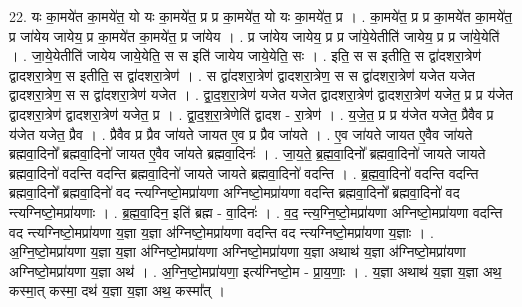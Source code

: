 \documentclass[17pt]{extarticle}
\begin{document}
22. यः का॒मये॑त का॒मये॑त॒ यो यः का॒मये॑त॒ प्र प्र का॒मये॑त॒ यो यः का॒मये॑त॒ प्र । . का॒मये॑त॒ प्र प्र का॒मये॑त का॒मये॑त॒ प्र जा॑येय जायेय॒ प्र का॒मये॑त का॒मये॑त॒ प्र जा॑येय । . प्र जा॑येय जायेय॒ प्र प्र जा॑ये॒येतीति॑ जायेय॒ प्र प्र जा॑ये॒येति॑ । . जा॒ये॒येतीति॑ जायेय जाये॒येति॒ स स इति॑ जायेय जाये॒येति॒ सः । . इति॒ स स इतीति॒ स द्वा॑दशरा॒त्रेण॑ द्वादशरा॒त्रेण॒ स इतीति॒ स द्वा॑दशरा॒त्रेण॑ । . स द्वा॑दशरा॒त्रेण॑ द्वादशरा॒त्रेण॒ स स द्वा॑दशरा॒त्रेण॑ यजेत यजेत द्वादशरा॒त्रेण॒ स स द्वा॑दशरा॒त्रेण॑ यजेत । . द्वा॒द॒श॒रा॒त्रेण॑ यजेत यजेत द्वादशरा॒त्रेण॑ द्वादशरा॒त्रेण॑ यजेत॒ प्र प्र य॑जेत द्वादशरा॒त्रेण॑ द्वादशरा॒त्रेण॑ यजेत॒ प्र । . द्वा॒द॒श॒रा॒त्रेणेति॑ द्वादश - रा॒त्रेण॑ । . य॒जे॒त॒ प्र प्र य॑जेत यजेत॒ प्रैवैव प्र य॑जेत यजेत॒ प्रैव । . प्रैवैव प्र प्रैव जा॑यते जायत ए॒व प्र प्रैव जा॑यते । . ए॒व जा॑यते जायत ए॒वैव जा॑यते ब्रह्मवा॒दिनो᳚ ब्रह्मवा॒दिनो॑ जायत ए॒वैव जा॑यते ब्रह्मवा॒दिनः॑ । . जा॒य॒ते॒ ब्र॒ह्म॒वा॒दिनो᳚ ब्रह्मवा॒दिनो॑ जायते जायते ब्रह्मवा॒दिनो॑ वदन्ति वदन्ति ब्रह्मवा॒दिनो॑ जायते जायते ब्रह्मवा॒दिनो॑ वदन्ति । . ब्र॒ह्म॒वा॒दिनो॑ वदन्ति वदन्ति ब्रह्मवा॒दिनो᳚ ब्रह्मवा॒दिनो॑ वद न्त्यग्निष्टो॒मप्रा॑यणा अग्निष्टो॒मप्रा॑यणा वदन्ति ब्रह्मवा॒दिनो᳚ ब्रह्मवा॒दिनो॑ वद न्त्यग्निष्टो॒मप्रा॑यणाः । . ब्र॒ह्म॒वा॒दिन॒ इति॑ ब्रह्म - वा॒दिनः॑ । . व॒द॒ न्त्य॒ग्नि॒ष्टो॒मप्रा॑यणा अग्निष्टो॒मप्रा॑यणा वदन्ति वद न्त्यग्निष्टो॒मप्रा॑यणा य॒ज्ञा य॒ज्ञा अ॑ग्निष्टो॒मप्रा॑यणा वदन्ति वद न्त्यग्निष्टो॒मप्रा॑यणा य॒ज्ञाः । . अ॒ग्नि॒ष्टो॒मप्रा॑यणा य॒ज्ञा य॒ज्ञा अ॑ग्निष्टो॒मप्रा॑यणा अग्निष्टो॒मप्रा॑यणा य॒ज्ञा अथाथ॑ य॒ज्ञा अ॑ग्निष्टो॒मप्रा॑यणा अग्निष्टो॒मप्रा॑यणा य॒ज्ञा अथ॑ । . अ॒ग्नि॒ष्टो॒मप्रा॑यणा॒ इत्य॑ग्निष्टो॒म - प्रा॒य॒णाः॒ । . य॒ज्ञा अथाथ॑ य॒ज्ञा य॒ज्ञा अथ॒ कस्मा॒त् कस्मा॒ दथ॑ य॒ज्ञा य॒ज्ञा अथ॒ कस्मा᳚त् । \newline
\end{document}
